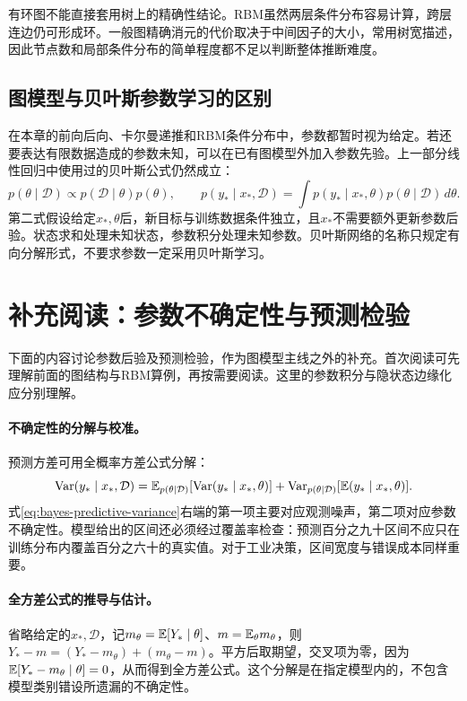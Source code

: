 有环图不能直接套用树上的精确性结论。RBM虽然两层条件分布容易计算，跨层连边仍可形成环。一般图精确消元的代价取决于中间因子的大小，常用树宽描述，因此节点数和局部条件分布的简单程度都不足以判断整体推断难度。

\subsection{图模型与贝叶斯参数学习的区别}
在本章的前向后向、卡尔曼递推和RBM条件分布中，参数都暂时视为给定。若还要表达有限数据造成的参数未知，可以在已有图模型外加入参数先验。上一部分线性回归中使用过的贝叶斯公式仍然成立：
\begin{equation}
 p(\theta\mid\mathcal D)\propto p(\mathcal D\mid\theta)p(\theta),\qquad
 p(y_*\mid x_*,\mathcal D)=\int p(y_*\mid x_*,\theta)p(\theta\mid\mathcal D)\,d\theta.
 \label{eq:bayes-predictive-integral}
\end{equation}
第二式假设给定$x_*,\theta$后，新目标与训练数据条件独立，且$x_*$不需要额外更新参数后验。状态求和处理未知状态，参数积分处理未知参数。贝叶斯网络的名称只规定有向分解形式，不要求参数一定采用贝叶斯学习。

\section*{补充阅读：参数不确定性与预测检验}
下面的内容讨论参数后验及预测检验，作为图模型主线之外的补充。首次阅读可先理解前面的图结构与RBM算例，再按需要阅读。这里的参数积分与隐状态边缘化应分别理解。
\paragraph{不确定性的分解与校准。}
预测方差可用全概率方差公式分解：
\begin{equation}
 \operatorname{Var}(y_*\mid x_*,\mathcal D)=\mathbb E_{p(\theta\mid\mathcal D)}[\operatorname{Var}(y_*\mid x_*,\theta)]
 +\operatorname{Var}_{p(\theta\mid\mathcal D)}[\mathbb E(y_*\mid x_*,\theta)].\label{eq:bayes-predictive-variance}
\end{equation}
式\eqref{eq:bayes-predictive-variance}右端的第一项主要对应观测噪声，第二项对应参数不确定性。模型给出的区间还必须经过覆盖率检查：预测百分之九十区间不应只在训练分布内覆盖百分之六十的真实值。对于工业决策，区间宽度与错误成本同样重要。

\paragraph{全方差公式的推导与估计。}
省略给定的$x_*,\mathcal D$，记$m_\theta=\mathbb{E}[Y_*\mid\theta]$、$m=\mathbb{E}_\theta m_\theta$，则$Y_*-m=(Y_*-m_\theta)+(m_\theta-m)$。平方后取期望，交叉项为零，因为$\mathbb{E}[Y_*-m_\theta\mid\theta]=0$，从而得到全方差公式。这个分解是在指定模型内的，不包含模型类别错设所遗漏的不确定性。

